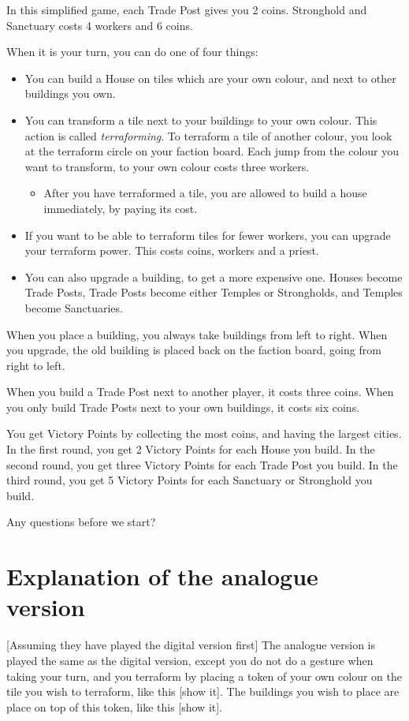 In this simplified game, each Trade Post gives you 2 coins. Stronghold and Sanctuary costs 4 workers and 6 coins.

When it is your turn, you can do one of four things:
\begin{itemize}
\item You can build a House on tiles which are your own colour, and next to other buildings you own. 
\item You can transform a tile next to your buildings to your own colour. This action is called \textit{terraforming}. To terraform a tile of another colour, you look at the terraform circle on your faction board. Each jump from the colour you want to transform, to your own colour costs three workers.
\begin{itemize}
\item After you have terraformed a tile, you are allowed to build a house immediately, by paying its cost.
\end{itemize}
\item If you want to be able to terraform tiles for fewer workers, you can upgrade your terraform power. This costs coins, workers and a priest.
\item You can also upgrade a building, to get a more expensive one. Houses become Trade Posts, Trade Posts become either Temples or Strongholds, and Temples become Sanctuaries.
\end{itemize}

When you place a building, you always take buildings from left to right. 
When you upgrade, the old building is placed back on the faction board, going from right to left.

When you build a Trade Post next to another player, it costs three coins. When you only build Trade Posts next to your own buildings, it costs six coins.

You get Victory Points by collecting the most coins, and having the largest cities.
In the first round, you get 2 Victory Points for each House you build.
In the second round, you get three Victory Points for each Trade Post you build.
In the third round, you get 5 Victory Points for each Sanctuary or Stronghold you build.

Any questions before we start?

\section{Explanation of the analogue version}
[Assuming they have played the digital version first]
The analogue version is played the same as the digital version, except you do not do a gesture when taking your turn, and you terraform by placing a token of your own colour on the tile you wish to terraform, like this [show it]. The buildings you wish to place are place on top of this token, like this [show it].

